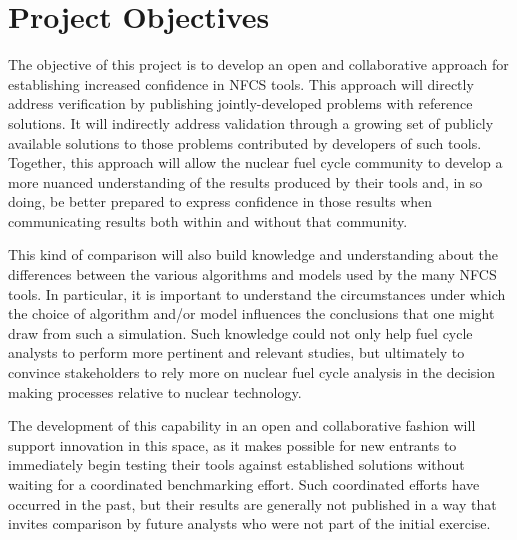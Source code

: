 \section{Project Objectives}

The objective of this project is to develop an open and collaborative approach
for establishing increased confidence in \gls{NFCS} tools. This approach will
directly address verification by publishing jointly-developed problems with
reference solutions.  It will indirectly address validation through a growing
set of publicly available solutions to those problems contributed by
developers of such tools.  Together, this approach will allow the nuclear
fuel cycle community to develop a more nuanced understanding of the results
produced by their tools and, in so doing, be better prepared to express
confidence in those results when communicating results both within and without
that community.

This kind of comparison will also build knowledge and understanding about the
differences between the various algorithms and models used by the many
NFCS tools. In particular, it is important to understand the
circumstances under which the choice of algorithm and/or model influences the
conclusions that one might draw from such a simulation. Such knowledge could
not only help fuel cycle analysts to perform more pertinent and relevant
studies, but ultimately to convince stakeholders to rely more on nuclear fuel
cycle analysis in the decision making processes relative to nuclear
technology.

The development of this capability in an open and collaborative fashion will
support innovation in this space, as it makes possible for new entrants to
immediately begin testing their tools against established solutions without
waiting for a coordinated benchmarking effort.  Such coordinated efforts have
occurred in the past, but their results are generally not published in a way
that invites comparison by future analysts who were not part of the initial
exercise.


